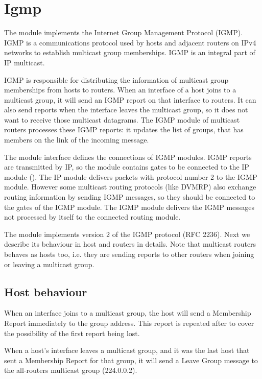\section{Igmp}
\label{sec:ipv4:igmp}

The  module implements the Internet Group Management Protocol
(IGMP). IGMP is a communications protocol used by hosts and adjacent routers on
IPv4 networks to establish multicast group memberships. IGMP is an integral part
of IP multicast.

IGMP is responsible for distributing the information of
multicast group memberships from hosts to routers. When an interface
of a host joins to a multicast group, it will send an IGMP report
on that interface to routers. It can also send reports when the
interface leaves the multicast group, so it does not want to
receive those multicast datagrams. The IGMP module of multicast
routers processes these IGMP reports: it updates the list of
groups, that has members on the link of the incoming message.

The  module interface defines the connections
of IGMP modules.
IGMP reports are transmitted by IP, so the module contains
gates to be connected to the IP module (). The IP
module delivers packets with protocol number 2 to the IGMP module.
However some multicast routing protocols (like DVMRP) also exchange
routing information by sending IGMP messages, so they should be
connected to the  gates of the IGMP module.
The IGMP module delivers the IGMP messages not processed by itself
to the connected routing module.

The  module implements version 2 of the IGMP protocol
(RFC 2236). Next we describe its behaviour in host and routers in details.
Note that multicast routers behaves as hosts too, i.e. they are sending
reports to other routers when joining or leaving a multicast group.

\subsection*{Host behaviour}

When an interface joins to a multicast group, the host
will send a Membership Report immediately to the group address.
This report is repeated after  to
cover the possibility of the first report being lost.

When a host's interface leaves a multicast group, and it was
the last host that sent a Membership Report for that group,
it will send a Leave Group message to the all-routers multicast
group (224.0.0.2).

